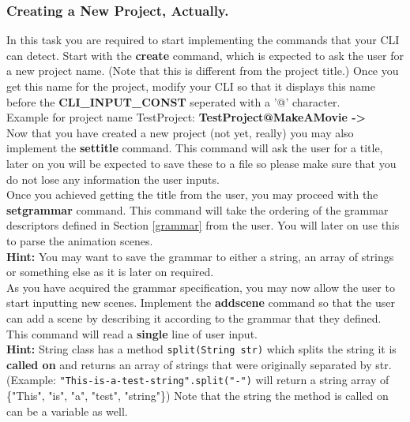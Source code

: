 \documentclass[a4paper]{article}
\begin{document}
	\subsubsection{Creating a New Project, Actually.}
	
	In this task you are required to start implementing the commands that your CLI can detect. Start with the \textbf{create} command, which is expected to ask the user for a new project name. (Note that this is different from the project title.) Once you get this name for the project, modify your CLI so that it displays this name before the \textbf{CLI\_INPUT\_CONST} seperated with a '@' character. \\
	
	\noindent Example for project name TestProject: \textbf{TestProject@MakeAMovie -\textgreater}\\
	
	Now that you have created a new project (not yet, really) you may also implement the \textbf{settitle} command. This command will ask the user for a title, later on you will be expected to save these to a file so please make sure that you do not lose any information the user inputs.\\
	
	Once you achieved getting the title from the user, you may proceed with the \textbf{setgrammar} command. This command will take the ordering of the grammar descriptors defined in Section \ref{grammar} from the user. You will later on use this to parse the animation scenes.\\
	
	\noindent \textbf{Hint:} You may want to save the grammar to either a string, an array of strings or something else as it is later on required. \\
	
	As you have acquired the grammar specification, you may now allow the user to start inputting new scenes. Implement the \textbf{addscene} command so that the user can add a scene by describing it according to the grammar that they defined. This command will read a \textbf{single} line of user input. \\
	
	\noindent \textbf{Hint:} String class has a method \lstinline{split(String str)} which splits the string it is \textbf{called on} and returns an array of strings that were originally separated by str. (Example: \lstinline{"This-is-a-test-string".split("-")} will return a string array of \{"This", "is", "a", "test", "string"\}) Note that the string the method is called on can be a variable as well. \\
	
\end{document}
